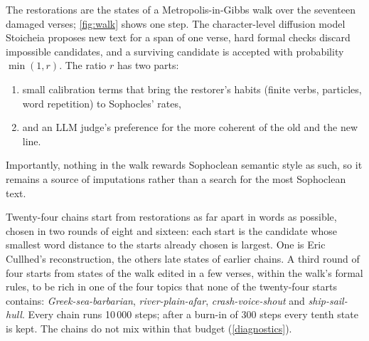 \documentclass{article}
\theoremstyle{plain}
\theoremstyle{definition}
\theoremstyle{remark}
\begin{document}
The restorations are the states of a Metropolis-in-Gibbs walk over the seventeen damaged verses; \autoref{fig:walk} shows one step. The character-level diffusion model Stoicheia \citep{cullhed2026stoicheiacharacterlevelmaskeddiffusion} proposes new text for a span of one verse, hard formal checks discard impossible candidates, and a surviving candidate is accepted with probability $\min(1, r)$. The ratio $r$ has two parts:

\begin{enumerate}
    \item small calibration terms that bring the restorer's habits
(finite verbs, particles, word repetition) to Sophocles' rates,
    \item and an LLM judge's preference for the more coherent of the old and the new line.
\end{enumerate}

Importantly, nothing in the walk rewards Sophoclean semantic style as such, so it remains a source of imputations rather than a search for the most Sophoclean text.

Twenty-four chains start from restorations as far apart in words as possible, chosen in two rounds of eight and sixteen: each start is the candidate whose smallest word distance to the starts already chosen is largest. One is Eric Cullhed's reconstruction, the others late states of earlier chains. A third round of four starts from states of the walk edited in a few verses, within the walk's formal rules, to be rich in one of the four topics that none of the twenty-four starts contains: \textit{Greek-sea-barbarian}, \textit{river-plain-afar}, \textit{crash-voice-shout} and \textit{ship-sail-hull}. Every chain runs 10\,000 steps; after a burn-in of 300 steps every tenth state is kept. The chains do not mix within that budget (\autoref{diagnostics}).
\end{document}
